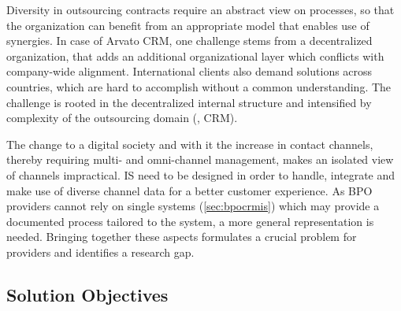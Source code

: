 Diversity in outsourcing contracts require an abstract view on processes, so that the organization can benefit from an appropriate model that enables use of synergies. In case of Arvato CRM, one challenge stems from a decentralized organization, that adds an additional organizational layer which conflicts with company-wide alignment. International clients also demand solutions across countries, which are hard to accomplish without a common understanding. The challenge is rooted in the decentralized internal structure and intensified by complexity of the outsourcing domain (\eg, \acrshort{CRM}).

The change to a digital society and with it the increase in contact channels, thereby requiring multi- and omni-channel management, makes an isolated view of channels impractical. \acrshort{IS} need to be designed in order to handle, integrate and make use of diverse channel data for a better customer experience. As BPO providers cannot rely on single systems (\cf \ref{sec:bpocrmis}) which may provide a documented process tailored to the system, a more general representation is needed. Bringing together these aspects formulates a crucial problem for providers and identifies a research gap. 



\subsection{Solution Objectives}
\label{sec:solobj}


